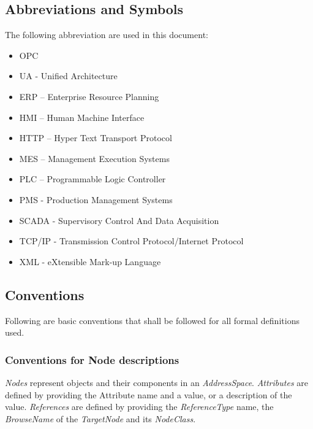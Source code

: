 \subsection{Abbreviations and Symbols}
The following abbreviation are used in this document:
\begin{itemize}
    \item OPC
    \item UA - Unified Architecture
    \item ERP – Enterprise Resource Planning
    \item HMI – Human Machine Interface
    \item HTTP – Hyper Text Transport Protocol
    \item MES – Management Execution Systems
    \item PLC – Programmable Logic Controller
    \item PMS - Production Management Systems
    \item SCADA - Supervisory Control And Data Acquisition
    \item TCP/IP - Transmission Control Protocol/Internet Protocol
    \item XML - eXtensible Mark-up Language
\end{itemize}

\subsection{Conventions}
Following are basic conventions that shall be followed for all formal definitions used.

\subsubsection{Conventions for Node descriptions}

\textit{Nodes} represent objects and their components in an \textit{AddressSpace}.
\textit{Attributes} are defined by providing the Attribute name and a value, or a description of the value.
\textit{References} are defined by providing the \textit{ReferenceType} name, the \textit{BrowseName} of the \textit{TargetNode} and its \textit{NodeClass}.


